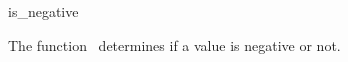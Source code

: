 \begin{ccRefFunction}{is_negative}

\ccDefinition

The function \ccRefName\ determines if a value is negative or not.


{}

\end{ccRefFunction}
